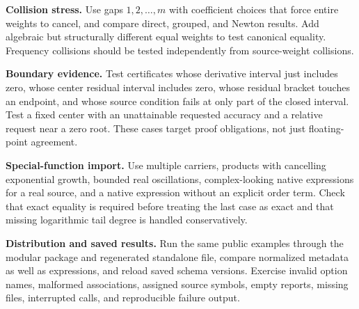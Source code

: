 \documentclass[11pt,a4paper]{article}
\theoremstyle{definition}
\begin{document}
\textbf{Collision stress.} Use gaps $1,2,\ldots,m$ with coefficient choices that force entire weights to cancel, and compare direct, grouped, and Newton results. Add algebraic but structurally different equal weights to test canonical equality. Frequency collisions should be tested independently from source-weight collisions.

\textbf{Boundary evidence.} Test certificates whose derivative interval just includes zero, whose center residual interval includes zero, whose residual bracket touches an endpoint, and whose source condition fails at only part of the closed interval. Test a fixed center with an unattainable requested accuracy and a relative request near a zero root. These cases target proof obligations, not just floating-point agreement.

\textbf{Special-function import.} Use multiple carriers, products with cancelling exponential growth, bounded real oscillations, complex-looking native expressions for a real source, and a native expression without an explicit order term. Check that exact equality is required before treating the last case as exact and that missing logarithmic tail degree is handled conservatively.

\textbf{Distribution and saved results.} Run the same public examples through the modular package and regenerated standalone file, compare normalized metadata as well as expressions, and reload saved schema versions. Exercise invalid option names, malformed associations, assigned source symbols, empty reports, missing files, interrupted calls, and reproducible failure output.
\end{document}

